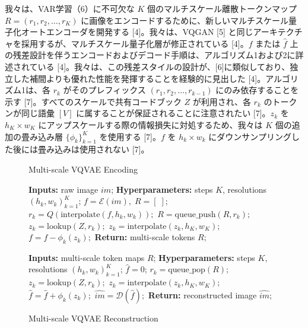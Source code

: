 \documentclass{article}
\begin{document}
我々は、VAR学習（6）に不可欠な $K$ 個のマルチスケール離散トークンマップ $R = (r_1, r_2, \ldots, r_K)$ に画像をエンコードするために、新しいマルチスケール量子化オートエンコーダを開発する [4]。我々は、VQGAN [5] と同じアーキテクチャを採用するが、マルチスケール量子化層が修正されている [4]。$f$ または $\hat{f}$ 上の残差設計を伴うエンコードおよびデコード手順は、アルゴリズム1および2に詳述されている [4]。我々は、この残差スタイルの設計が、[6]に類似しており、独立した補間よりも優れた性能を発揮することを経験的に見出した [4]。アルゴリズム1は、各 $r_k$ がそのプレフィックス $(r_1, r_2, \ldots, r_{k-1})$ にのみ依存することを示す [7]。すべてのスケールで共有コードブック $Z$ が利用され、各 $r_k$ のトークンが同じ語彙 $[V]$ に属することが保証されることに注意されたい [7]。$z_k$ を $h_K \times w_K$ にアップスケールする際の情報損失に対処するため、我々は $K$ 個の追加の畳み込み層 $\{\phi_k\}_{k=1}^K$ を使用する [7]。$f$ を $h_k \times w_k$ にダウンサンプリングした後には畳み込みは使用されない [7]。

\begin{figure}[t]
\centering
\begin{minipage}{0.47\linewidth}
\begin{algorithm}[H]
\caption{Multi-scale VQVAE Encoding}
\begin{algorithmic}[1]
\State \textbf{Inputs:} raw image $im$;
\State \textbf{Hyperparameters:} steps $K$, resolutions $(h_k, w_k)_{k=1}^{K}$;
\State $f = \mathcal{E}(im),\; R = [\;]$;
    \State $r_k = Q(\text{interpolate}(f, h_k, w_k));$
    \State $R = \text{queue\_push}(R, r_k);$
    \State $z_k = \text{lookup}(Z, r_k);$
    \State $z_k = \text{interpolate}(z_k, h_K, w_K);$
    \State $f = f - \phi_k(z_k);$
\EndFor
\State \textbf{Return:} multi-scale tokens $R$;
\end{algorithmic}
\end{algorithm}
\end{minipage}
\hfill
\begin{minipage}{0.47\linewidth}
\begin{algorithm}[H]
\caption{Multi-scale VQVAE Reconstruction}
\begin{algorithmic}[1]
\State \textbf{Inputs:} multi-scale token maps $R$;
\State \textbf{Hyperparameters:} steps $K$, resolutions $(h_k, w_k)_{k=1}^{K}$;
\State $\hat{f} = 0$;
    \State $r_k = \text{queue\_pop}(R);$
    \State $z_k = \text{lookup}(Z, r_k);$
    \State $z_k = \text{interpolate}(z_k, h_K, w_K);$
    \State $\hat{f} = \hat{f} + \phi_k(z_k);$
\EndFor
\State $\hat{im} = \mathcal{D}(\hat{f});$
\State \textbf{Return:} reconstructed image $\hat{im}$;
\end{algorithmic}
\end{algorithm}
\end{minipage}
\end{figure}
\end{document}
